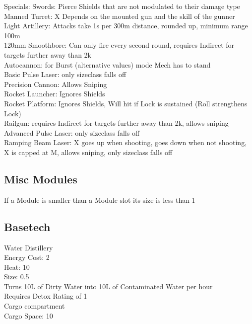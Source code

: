 \documentclass{article}
\begin{document}
    Specials:
    Swords: Pierce Shields that are not modulated to their damage type\\
    Manned Turret: X Depends on the mounted gun and the skill of the gunner\\
    Light Artillery: Attacks take 1s per 300m distance, rounded up, minimum range 100m\\
    120mm Smoothbore: Can only fire every second round, requires Indirect for targets further away than 2k\\
    Autocannon: for Burst (alternative values) mode Mech has to stand\\
    Basic Pulse Laser: only sizeclass falls off\\
    Precision Cannon: Allows Sniping \\
    Rocket Launcher: Ignores Shields \\
    Rocket Platform: Ignores Shields, Will hit if Lock is sustained (Roll strengthens Lock)\\
    Railgun: requires Indirect for targets further away than 2k, allows sniping\\
    Advanced Pulse Laser: only sizeclass falls off\\
    Ramping Beam Laser: X goes up when shooting, goes down when not shooting, X is capped at M, allows sniping,
            only sizeclass falls off\\


    \subsection{Misc Modules}
    If a Module is smaller than a Module slot its size is less than 1
    \newline
    \subsection{Basetech}
    Water Distillery \\
    Energy Cost: 2\\
    Heat: 10\\
    Size: 0.5\\
    Turns 10L of Dirty Water into 10L of Contaminated Water per hour\\
    Requires Detox Rating of 1\\
    \newline
    Cargo compartment\\
    Cargo Space: 10 \\
    \newline
\end{document}
